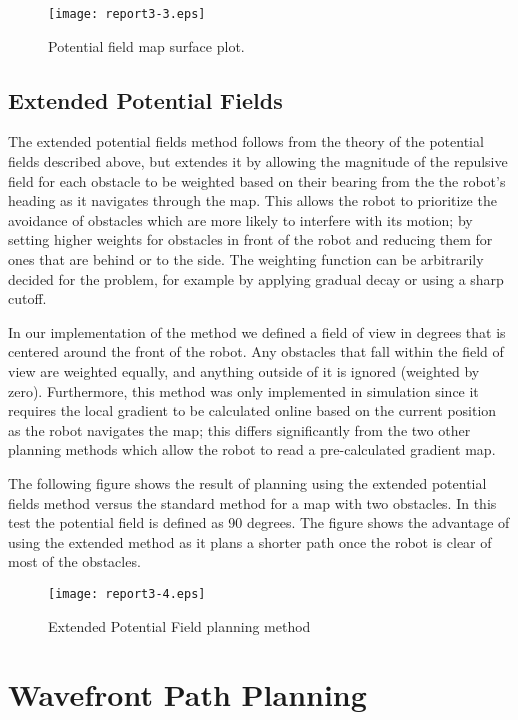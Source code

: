 \documentclass{article}
\begin{document}
\begin{figure}[h]
  \texttt{[image: report3-3.eps]} \label{potField}
  \caption{Potential field map surface plot.}
\end{figure}

\subsection{Extended Potential Fields}

The extended potential fields method follows from the theory of the potential
fields described above, but extendes it by allowing the magnitude of the
repulsive field for each obstacle to be weighted based on their bearing from
the the robot's heading as it navigates through the map. This allows the robot
to prioritize the avoidance of obstacles which are more likely to interfere
with its motion; by setting higher weights for obstacles in front of the robot
and reducing them for ones that are behind or to the side. The weighting
function can be arbitrarily decided for the problem, for example by applying
gradual decay or using a sharp cutoff.

In our implementation of the method we defined a field of view in degrees that
is centered around the front of the robot. Any obstacles that fall within the
field of view are weighted equally, and anything outside of it is ignored
(weighted by zero). Furthermore, this method was only implemented in
simulation since it requires the local gradient to be calculated online based
on the current position as the robot navigates the map; this differs
significantly from the two other planning methods which allow the robot to
read a pre-calculated gradient map.

The following figure shows the result of planning using the extended potential
fields method versus the standard method for a map with two obstacles. In this
test the potential field is defined as 90 degrees. The figure shows the
advantage of using the extended method as it plans a shorter path once the
robot is clear of most of the obstacles.

\begin{figure}[h]
  \texttt{[image: report3-4.eps]} \label{ExtPotField}
  \caption{Extended Potential Field planning method}
\end{figure}{\newpage}

\section{Wavefront Path Planning}
\end{document}

